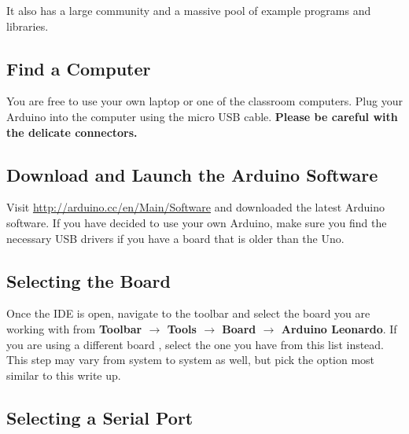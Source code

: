 \documentclass[11pt,a4paper]{article}
\begin{document}
It also has a large community and a massive pool of example programs and libraries.

\subsection{Find a Computer} %
\label{sub:find_a_computer}
You are free to use your own laptop or one of the classroom computers.  Plug your Arduino into the computer using the micro USB cable.  \textbf{Please be careful with the delicate connectors.}


\subsection{Download and Launch the Arduino Software} %
\label{sub:download_and_launch_the_arduino_software}
Visit \url{http://arduino.cc/en/Main/Software} and downloaded the latest Arduino software\cite{arduino_dl}.  If you have decided to use your own Arduino, make sure you find the necessary USB drivers if you have a board that is older than the Uno.


\subsection{Selecting the Board} %
\label{sub:selecting_the_board}
Once the IDE is open, navigate to the toolbar and select the board you are working with from \textbf{Toolbar $\rightarrow$ Tools $\rightarrow$ Board $\rightarrow$ Arduino Leonardo}.  If you are using a different board , select the one you have from this list instead.  This step may vary from system to system as well, but pick the option most similar to this write up.


\subsection{Selecting a Serial Port} %
\end{document}
